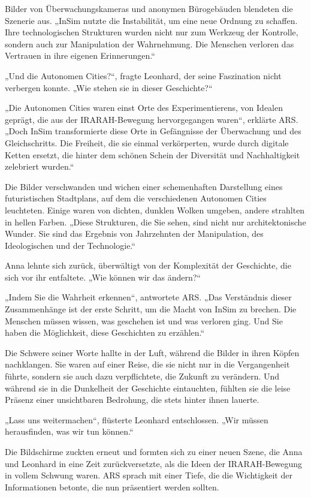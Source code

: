 \documentclass[
]{article}
\begin{document}
Bilder von Überwachungskameras und anonymen Bürogebäuden blendeten die
Szenerie aus. „InSim nutzte die Instabilität, um eine neue Ordnung zu
schaffen. Ihre technologischen Strukturen wurden nicht nur zum Werkzeug
der Kontrolle, sondern auch zur Manipulation der Wahrnehmung. Die
Menschen verloren das Vertrauen in ihre eigenen Erinnerungen.``

„Und die Autonomen Cities?{\kern0pt}``, fragte Leonhard, der seine
Faszination nicht verbergen konnte. „Wie stehen sie in dieser
Geschichte?{\kern0pt}``

„Die Autonomen Cities waren einst Orte des Experimentierens, von Idealen
geprägt, die aus der IRARAH-Bewegung hervorgegangen waren``, erklärte
ARS. „Doch InSim transformierte diese Orte in Gefängnisse der
Überwachung und des Gleichschritts. Die Freiheit, die sie einmal
verkörperten, wurde durch digitale Ketten ersetzt, die hinter dem
schönen Schein der Diversität und Nachhaltigkeit zelebriert wurden.``

Die Bilder verschwanden und wichen einer schemenhaften Darstellung eines
futuristischen Stadtplans, auf dem die verschiedenen Autonomen Cities
leuchteten. Einige waren von dichten, dunklen Wolken umgeben, andere
strahlten in hellen Farben. „Diese Strukturen, die Sie sehen, sind nicht
nur architektonische Wunder. Sie sind das Ergebnis von Jahrzehnten der
Manipulation, des Ideologischen und der Technologie.``

Anna lehnte sich zurück, überwältigt von der Komplexität der Geschichte,
die sich vor ihr entfaltete. „Wie können wir das ändern?{\kern0pt}``

„Indem Sie die Wahrheit erkennen``, antwortete ARS. „Das Verständnis
dieser Zusammenhänge ist der erste Schritt, um die Macht von InSim zu
brechen. Die Menschen müssen wissen, was geschehen ist und was verloren
ging. Und Sie haben die Möglichkeit, diese Geschichten zu erzählen.``

Die Schwere seiner Worte hallte in der Luft, während die Bilder in ihren
Köpfen nachklangen. Sie waren auf einer Reise, die sie nicht nur in die
Vergangenheit führte, sondern sie auch dazu verpflichtete, die Zukunft
zu verändern. Und während sie in die Dunkelheit der Geschichte
eintauchten, fühlten sie die leise Präsenz einer unsichtbaren Bedrohung,
die stets hinter ihnen lauerte.

„Lass uns weitermachen``, flüsterte Leonhard entschlossen. „Wir müssen
herausfinden, was wir tun können.``

Die Bildschirme zuckten erneut und formten sich zu einer neuen Szene,
die Anna und Leonhard in eine Zeit zurückversetzte, als die Ideen der
IRARAH-Bewegung in vollem Schwung waren. ARS sprach mit einer Tiefe, die
die Wichtigkeit der Informationen betonte, die nun präsentiert werden
sollten.
\end{document}

